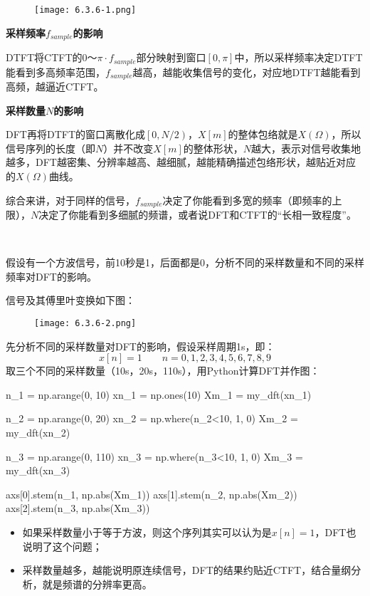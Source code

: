 \begin{figure}[h]
\centering
\texttt{[image: 6.3.6-1.png]}
\end{figure}

{\bf 采样频率$f_{sample}$的影响}

DTFT将CTFT的$0\text{～}\pi \cdot f_{sample}$部分映射到窗口$\left[ 0,\pi \right] $中，所以采样频率决定DTFT能看到多高频率范围，$f_{sample}$越高，越能收集信号的变化，对应地DTFT越能看到高频，越逼近CTFT。

{\bf 采样数量$N$的影响}

DFT再将DTFT的窗口离散化成$\left[ 0,N/2 \right) $，$X\left[ m \right] $的整体包络就是$X\left( \varOmega \right) $，所以信号序列的长度（即$N$）并不改变$X\left[ m \right] $的整体形状，$N$越大，表示对信号收集地越多，DFT越密集、分辨率越高、越细腻，越能精确描述包络形状，越贴近对应的$X\left( \varOmega \right) $曲线。

综合来讲，对于同样的信号，$f_{sample}$决定了你能看到多宽的频率（即频率的上限），$N$决定了你能看到多细腻的频谱，或者说DFT和CTFT的“长相一致程度”。

~

\begin{example}
假设有一个方波信号，前10秒是1，后面都是0，分析不同的采样数量和不同的采样频率对DFT的影响。
\end{example}

信号及其傅里叶变换如下图：
\begin{figure}[h]
\centering
\texttt{[image: 6.3.6-2.png]}
\end{figure}

先分析不同的采样数量对DFT的影响，假设采样周期1s，即：
\[
x\left[ n \right] =1 \qquad n=0,1,2,3,4,5,6,7,8,9
\]
取三个不同的采样数量（10s，20s，110s），用Python计算DFT并作图：

\begin{python}
n_1  = np.arange(0, 10)
xn_1 = np.ones(10)
Xm_1 = my_dft(xn_1)

n_2  = np.arange(0, 20)
xn_2 = np.where(n_2<10, 1, 0)
Xm_2 = my_dft(xn_2)

n_3  = np.arange(0, 110)
xn_3 = np.where(n_3<10, 1, 0)
Xm_3 = my_dft(xn_3)

axs[0].stem(n_1, np.abs(Xm_1))
axs[1].stem(n_2, np.abs(Xm_2))
axs[2].stem(n_3, np.abs(Xm_3))
\end{python}

\begin{itemize}
    \item 如果采样数量小于等于方波，则这个序列其实可以认为是$x\left[ n \right] =1$，DFT也说明了这个问题；
    \item 采样数量越多，越能说明原连续信号，DFT的结果约贴近CTFT，结合量纲分析，就是频谱的分辨率更高。
\end{itemize}

